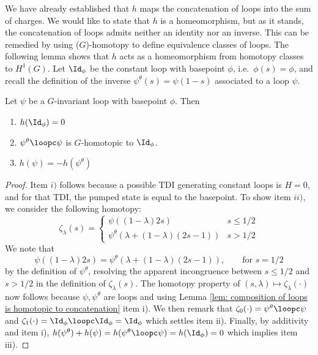 We have already established that $h$ maps the concatenation of loops into the sum of charges. We would like to state that $h$ is a homeomorphism, but as it stands, the concatenation  of loops admits neither an identity nor an inverse. This can be remedied by using ($G$)-homotopy to define equivalence classes of loops. The following lemma shows that $h$ acts as a homeomorphism from homotopy classes to $H^1(G)$. 
Let $\Id_\phi$ be the constant loop with basepoint $\phi$, i.e.\ $\phi(s)=\phi$, and recall the definition of the inverse ${\psi^{\theta}}(s)=\psi(1-s)$ associated to a loop  $\psi$.
\begin{lemma}\label{lem: inverse loop}
	Let $\psi$ be a $G$-invariant loop with basepoint $\phi$. Then
	\begin{enumerate}
		\item $h(\Id_\phi)=0$
		\item  ${\psi^{\theta}}\loopc\psi$ is $G$-homotopic to $\Id_\phi$.
		\item $h(\psi)=-h({\psi^{\theta}})$
	\end{enumerate}
\end{lemma}
\begin{proof}
	Item $i)$ follows because a possible TDI generating constant loops is $H=0$, and for that TDI, the pumped state is equal to the basepoint. 
	To show item $ii)$, we consider the following homotopy:
	\begin{equation}
	\zeta_\lambda(s) = \begin{cases} \psi((1-\lambda)2s) &  s\leq 1/2 \\
	{\psi^{\theta}}(\lambda+(1-\lambda)(2s-1))  &  s >1/2
	\end{cases}
	\end{equation}
	We note that
	$$
	\psi((1-\lambda) 2s)=  {\psi^{\theta}}(\lambda+(1-\lambda)(2s-1)), \qquad \text{for $s=1/2$}
	$$
	by the definition of ${\psi^{\theta}}$, resolving the apparent incongruence between $s\leq 1/2$ and $s>1/2$ in the definition of $\zeta_\lambda(s)$. 
	The homotopy property of $(s,\lambda)\mapsto \zeta_\lambda(\cdot)$ now follows because $\psi,{\psi^{\theta}}$ are loops and using Lemma \ref{lem: composition of loops is homotopic to concatenation} item i). 
	We then remark that $\zeta_0(\cdot)= {\psi^{\theta}}\loopc\psi$ and $\zeta_1(\cdot)= \Id_\phi\loopc\Id_\phi=\Id_\phi$ which settles item ii). Finally, by additivity and item i), $
	h({\psi^{\theta}})+h(\psi)= h({\psi^{\theta}}\loopc\psi)= h(\Id_\phi)= 0
	$
	which implies item iii). 
\end{proof}


